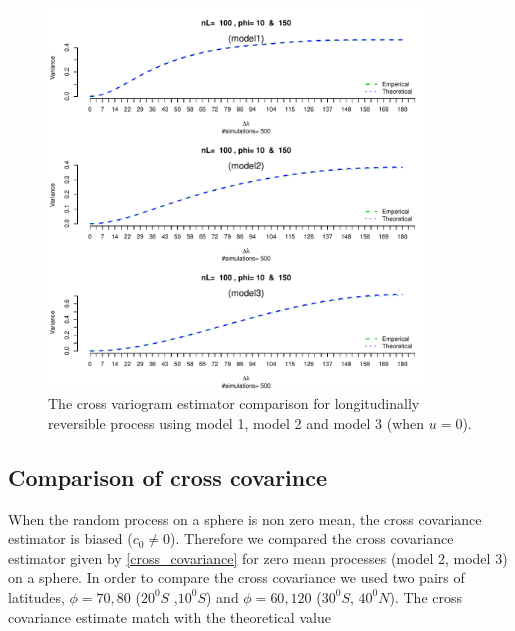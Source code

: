 \begin{figure}[H]
	\centering
	\includegraphics [width=0.9\textwidth ]{graphs/results_variogram_comparison}
	\caption[Variogram comparison]{The cross variogram estimator comparison for longitudinally reversible process using  model 1, model 2 and model 3 (when $u=0$).}
\end{figure}

\subsection{\bf Comparison of cross covarince}

When the random process on a sphere is non zero mean, the cross covariance estimator is biased ($c_0 \ne 0$). Therefore we compared the cross covariance estimator given by \ref{cross_covariance} for zero mean processes (model 2, model 3) on a sphere. In order to compare the cross covariance we used two pairs of latitudes, $\phi = 70, 80$ ($20^0S$ ,$10^0S$) and $\phi = 60, 120$ ($30^0S$, $40^0N$). The cross covariance estimate match with the theoretical value   


